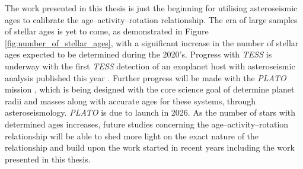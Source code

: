 The work presented in this thesis is just the beginning for utilising asteroseismic ages to calibrate the age--activity--rotation relationship. The era of large samples of stellar ages is yet to come, as demonstrated in Figure \ref{fig:number_of_stellar_ages}, with a significant increase in the number of stellar ages expected to be determined during the 2020's. Progress with \textit{TESS} is underway with the first \textit{TESS} detection of an exoplanet host with asteroseismic analysis published this year \citep{Huber_etal_2019}. Further progress will be made with the \textit{PLATO} mission \citep{Rauer_etal_2014}, which is being designed with the core science goal of determine planet radii and masses along with accurate ages for these systems, through asteroseismology. \textit{PLATO} is due to launch in 2026. As the number of stars with determined ages increases, future studies concerning the age--activity--rotation relationship will be able to shed more light on the exact nature of the relationship and build upon the work started in recent years including the work presented in this thesis.

